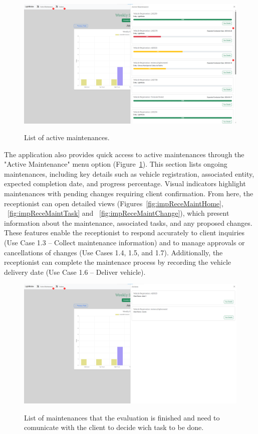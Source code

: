 \begin{figure}[h]
  \caption{List of active maintenances.}
  \centering
  \includegraphics[width=\textwidth]{figs/Implementation/rececionist/activeMaintenances}
  \label{fig:impReceListMaint}
\end{figure}


The application also provides quick access to active maintenances through the "Active Maintenance" menu option (Figure~\ref{fig:impReceListMaint}). This section lists ongoing maintenances, including key details such as vehicle registration, associated entity, expected completion date, and progress percentage. Visual indicators highlight maintenances with pending changes requiring client confirmation. From here, the receptionist can open detailed views (Figures~\ref{fig:impReceMaintHome}, ~\ref{fig:impReceMaintTask} and ~\ref{fig:impReceMaintChange}), which present information about the maintenance, associated tasks, and any proposed changes. These features enable the receptionist to respond accurately to client inquiries (Use Case 1.3 – Collect maintenance information) and to manage approvals or cancellations of changes (Use Cases 1.4, 1.5, and 1.7). Additionally, the receptionist can complete the maintenace process by recording the vehicle delivery date (Use Case 1.6 – Deliver vehicle).


\begin{figure}[h]
  \caption{List of maintenances that the evaluation is finished and need to comunicate with the client to decide wich task to be done.}
  \centering
  \includegraphics[width=\textwidth]{figs/Implementation/rececionist/action_list}
  \label{fig:impReceListAction}
\end{figure}



